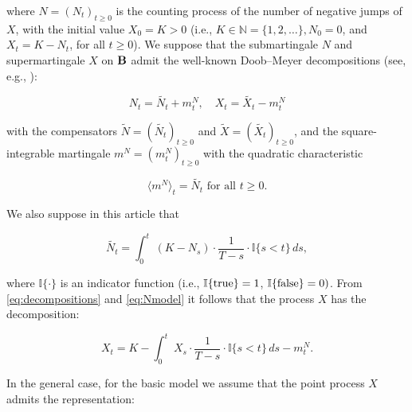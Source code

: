 where $N=(N_t)_{t \geq 0}$ is the counting process of the number of negative jumps of  $X$, with the initial value $X_0 = K>0$ (i.e., $K\in \mathbb{N} =\{1, 2, …\}, N_0 = 0$, and $X_t = K - N_t$, for all $t \geq 0$). We suppose that the submartingale $N$ and supermartingale $X$ on ${\textbf B}$ admit the well-known Doob--Meyer decompositions (see, e.g., \cite{dellacherie}):

\begin{equation}\label{eq:decompositions}

	N_t =\tilde{N_t} + {m_t^N}, \quad X_t = \tilde{X_t} -{m_t^N}

\end{equation}

with the compensators $\tilde{N}=(\tilde{N_t})_{t \geq 0}$ and $\tilde{X} = (\tilde{X_t})_{t \geq 0}$, and the square-integrable martingale $m^N=(m_t^N)_{t \geq 0}$ with the quadratic characteristic

\begin{equation}\label{eq:compensator}

	{\langle {m^N} \rangle}_t = \tilde{N_t} \text{ for all } t \geq 0.

\end{equation}

We also suppose in this article that

\begin{equation}\label{eq:Nmodel}

	\tilde{N_t} = \int_{0}^{t}\!\ (K - N_s)\cdot{\frac{1}{T - s}}\cdot \mathbb{I}\{s< t\}\,ds,

\end{equation}

where $\mathbb{I}\{\cdot\}$ is an indicator function (i.e., $\mathbb{I}\{{\rm true}\}=1$, $\mathbb{I}\{{\rm false}\}= 0)$. From \eqref{eq:decompositions} and \eqref{eq:Nmodel} it follows that the process $X$ has the decomposition:



\begin{equation}\label{eq:Xmodel}

	X_t = K - \int_{0}^{t}\!\ X_s \cdot{\frac{1}{T - s}}\cdot \mathbb{I}\{s< t\}\,ds - {m_t^N}.

\end{equation}



	In the general case, for the basic model we assume that the point process $X$ admits the representation:

